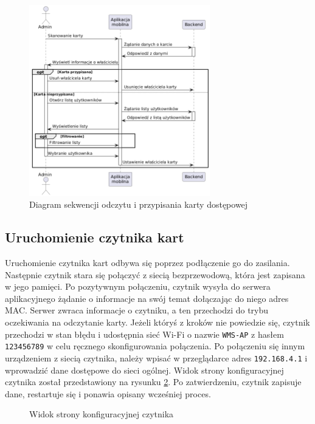 \begin{figure}[H]
    \centering
    \includegraphics[width=0.7\textwidth]{graf/cardSeq.png}
    \caption{Diagram sekwencji odczytu i przypisania karty dostępowej}
    \label{fig:assignCard}
\end{figure}

\subsection{Uruchomienie czytnika kart}

Uruchomienie czytnika kart odbywa się poprzez podłączenie go do zasilania. Następnie czytnik stara się połączyć z siecią bezprzewodową, która jest zapisana w jego pamięci. Po pozytywnym połączeniu, czytnik wysyła do serwera aplikacyjnego żądanie o informacje na swój temat dołączając do niego adres MAC. Serwer zwraca informacje o czytniku, a ten przechodzi do trybu oczekiwania na odczytanie karty. Jeżeli któryś z kroków nie powiedzie się, czytnik przechodzi w stan błędu i udostępnia sieć Wi-Fi o nazwie \texttt{WMS-AP} z hasłem \texttt{123456789} w celu ręcznego skonfigurowania połączenia. Po połączeniu się innym urządzeniem z siecią czytnika, należy wpisać w przeglądarce adres \texttt{192.168.4.1} i wprowadzić dane dostępowe do sieci ogólnej. Widok strony konfiguracyjnej czytnika został przedstawiony na rysunku \ref{fig:readerConfig}. Po zatwierdzeniu, czytnik zapisuje dane, restartuje się i ponawia opisany wcześniej proces.

\begin{figure}[H]
    \centering
    \caption{Widok strony konfiguracyjnej czytnika}
    \label{fig:readerConfig}
\end{figure}